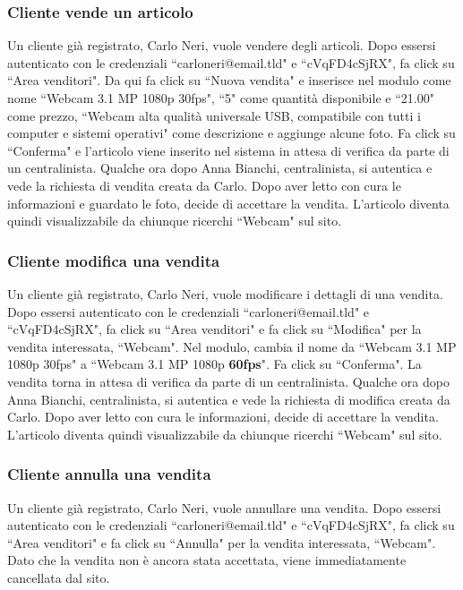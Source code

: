 \documentclass[12pt]{article}
\begin{document}
\subsubsection{Cliente vende un articolo}
Un cliente già registrato, Carlo Neri, vuole vendere degli articoli. Dopo essersi autenticato con le credenziali ``carloneri@email.tld" e ``cVqFD4cSjRX", fa click su ``Area venditori".
Da qui fa click su ``Nuova vendita" e inserisce nel modulo come nome ``Webcam 3.1 MP 1080p 30fps", ``5" come quantità disponibile e ``21.00" come prezzo, ``Webcam alta qualità universale USB, compatibile con tutti i computer e sistemi operativi" come descrizione e aggiunge alcune foto. Fa click su ``Conferma" e l'articolo viene inserito nel sistema in attesa di verifica da parte di un centralinista.
Qualche ora dopo Anna Bianchi, centralinista, si autentica e vede la richiesta di vendita creata da Carlo. Dopo aver letto con cura le informazioni e guardato le foto, decide di accettare la vendita. L'articolo diventa quindi visualizzabile da chiunque ricerchi ``Webcam" sul sito.

\subsubsection{Cliente modifica una vendita}
Un cliente già registrato, Carlo Neri, vuole modificare i dettagli di una vendita. Dopo essersi autenticato con le credenziali ``carloneri@email.tld" e ``cVqFD4cSjRX", fa click su ``Area venditori" e fa click su ``Modifica" per la vendita interessata, ``Webcam".
Nel modulo, cambia il nome da ``Webcam 3.1 MP 1080p 30fps" a ``Webcam 3.1 MP 1080p \textbf{60fps}". Fa click su ``Conferma".
La vendita torna in attesa di verifica da parte di un centralinista.
Qualche ora dopo Anna Bianchi, centralinista, si autentica e vede la richiesta di modifica creata da Carlo. Dopo aver letto con cura le informazioni, decide di accettare la vendita. L'articolo diventa quindi visualizzabile da chiunque ricerchi ``Webcam" sul sito.

\subsubsection{Cliente annulla una vendita}
Un cliente già registrato, Carlo Neri, vuole annullare una vendita. Dopo essersi autenticato con le credenziali ``carloneri@email.tld" e ``cVqFD4cSjRX", fa click su ``Area venditori" e fa click su ``Annulla" per la vendita interessata, ``Webcam".
Dato che la vendita non è ancora stata accettata, viene immediatamente cancellata dal sito.
\end{document}
